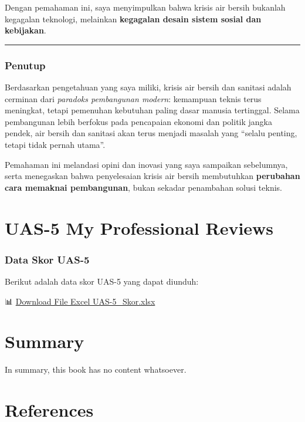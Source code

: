 \documentclass[
  letterpaper,
  DIV=11,
  numbers=noendperiod]{scrreprt}
\begin{document}
Dengan pemahaman ini, saya menyimpulkan bahwa krisis air bersih bukanlah
kegagalan teknologi, melainkan \textbf{kegagalan desain sistem sosial
dan kebijakan}.

\begin{center}\rule{0.5\linewidth}{0.5pt}\end{center}

\subsection{Penutup}\label{penutup}

Berdasarkan pengetahuan yang saya miliki, krisis air bersih dan sanitasi
adalah cerminan dari \emph{paradoks pembangunan modern}: kemampuan
teknis terus meningkat, tetapi pemenuhan kebutuhan paling dasar manusia
tertinggal. Selama pembangunan lebih berfokus pada pencapaian ekonomi
dan politik jangka pendek, air bersih dan sanitasi akan terus menjadi
masalah yang ``selalu penting, tetapi tidak pernah utama''.

Pemahaman ini melandasi opini dan inovasi yang saya sampaikan
sebelumnya, serta menegaskan bahwa penyelesaian krisis air bersih
membutuhkan \textbf{perubahan cara memaknai pembangunan}, bukan sekadar
penambahan solusi teknis.


\chapter{UAS-5 My Professional
Reviews}\label{uas-5-my-professional-reviews}

\subsection{Data Skor UAS-5}\label{data-skor-uas-5}

Berikut adalah data skor UAS-5 yang dapat diunduh:

📊 \href{UAS-5_Skor.xlsx}{Download File Excel UAS-5\_Skor.xlsx}


\chapter{Summary}\label{summary}

In summary, this book has no content whatsoever.


\chapter*{References}\label{references}


\label{refs}
\end{document}
